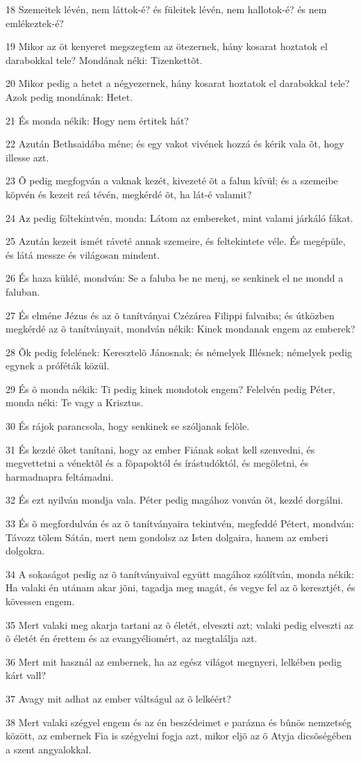\par 18 Szemeitek lévén, nem láttok-é? és füleitek lévén, nem hallotok-é? és nem emlékeztek-é?
\par 19 Mikor az öt kenyeret megszegtem az ötezernek, hány kosarat hoztatok el darabokkal tele? Mondának néki: Tizenkettõt.
\par 20 Mikor pedig a hetet a négyezernek, hány kosarat hoztatok el darabokkal tele? Azok pedig mondának: Hetet.
\par 21 És monda nékik: Hogy nem értitek hát?
\par 22 Azután Bethsaidába méne; és egy vakot vivének hozzá és kérik vala õt, hogy illesse azt.
\par 23 Õ pedig megfogván a vaknak kezét, kivezeté õt a falun kívül; és a szemeibe köpvén és kezeit reá tévén, megkérdé õt, ha lát-é valamit?
\par 24 Az pedig föltekintvén, monda: Látom az embereket, mint valami járkáló fákat.
\par 25 Azután kezeit ismét ráveté annak szemeire, és feltekintete véle. És megépüle, és látá messze és világosan mindent.
\par 26 És haza küldé, mondván: Se a faluba be ne menj, se senkinek el ne mondd a faluban.
\par 27 És elméne Jézus és az õ tanítványai Czézárea Filippi falvaiba; és útközben megkérdé az õ tanítványait, mondván nékik: Kinek mondanak engem az emberek?
\par 28 Õk pedig felelének: Keresztelõ Jánosnak; és némelyek Illésnek; némelyek pedig egynek a próféták közül.
\par 29 És õ monda nékik: Ti pedig kinek mondotok engem? Felelvén pedig Péter, monda néki: Te vagy a Krisztus.
\par 30 És rájok parancsola, hogy senkinek se szóljanak felõle.
\par 31 És kezdé õket tanítani, hogy az ember Fiának sokat kell szenvedni, és megvettetni a vénektõl és a fõpapoktól és írástudóktól, és megöletni, és harmadnapra feltámadni.
\par 32 És ezt nyilván mondja vala. Péter pedig magához vonván õt, kezdé dorgálni.
\par 33 És õ megfordulván és az õ tanítványaira tekintvén, megfeddé Pétert, mondván: Távozz tõlem Sátán, mert nem gondolsz az Isten dolgaira, hanem az emberi dolgokra.
\par 34 A sokaságot pedig az õ tanítványaival együtt magához szólítván, monda nékik: Ha valaki én utánam akar jõni, tagadja meg magát, és vegye fel az õ keresztjét, és kövessen engem.
\par 35 Mert valaki meg akarja tartani az õ életét, elveszti azt; valaki pedig elveszti az õ életét én érettem és az evangyéliomért, az megtalálja azt.
\par 36 Mert mit használ az embernek, ha az egész világot megnyeri, lelkében pedig kárt vall?
\par 37 Avagy mit adhat az ember váltságul az õ lelkéért?
\par 38 Mert valaki szégyel engem és az én beszédeimet e parázna és bûnös nemzetség között, az embernek Fia is szégyelni fogja azt, mikor eljõ az õ Atyja dicsõségében a szent angyalokkal.

